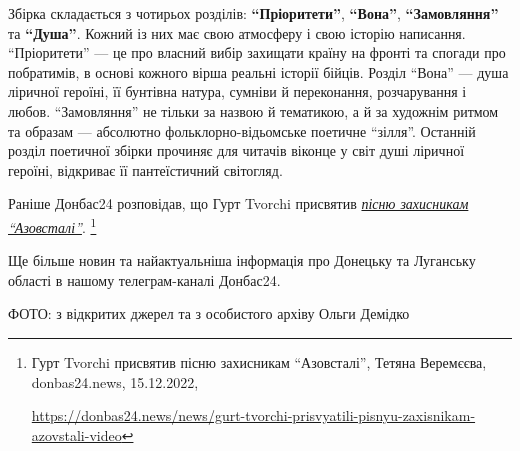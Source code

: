Збірка складається з чотирьох розділів: \textbf{\enquote{Пріоритети}},
\textbf{\enquote{Вона}}, \textbf{\enquote{Замовляння}} та
\textbf{\enquote{Душа}}. Кожний із них має свою атмосферу і свою історію
написання. \enquote{Пріоритети} — це про власний вибір захищати країну на
фронті та спогади про побратимів, в основі кожного вірша реальні історії
бійців. Розділ \enquote{Вона} — душа ліричної героїні, її бунтівна натура,
сумніви й переконання, розчарування і любов.  \enquote{Замовляння} не тільки за
назвою й тематикою, а й за художнім ритмом та образам — абсолютно
фольклорно-відьомське поетичне \enquote{зілля}. Останній розділ поетичної
збірки прочиняє для читачів віконце у світ душі ліричної героїні, відкриває її
пантеїстичний світогляд.


Раніше Донбас24 розповідав, що Гурт Tvorchi присвятив \href{https://donbas24.news/news/gurt-tvorchi-prisvyatili-pisnyu-zaxisnikam-azovstali-video}{\emph{пісню захисникам \enquote{Азовсталі}}}.%
\footnote{Гурт Tvorchi присвятив пісню захисникам \enquote{Азовсталі}, Тетяна Веремєєва, donbas24.news, 15.12.2022, \par\url{https://donbas24.news/news/gurt-tvorchi-prisvyatili-pisnyu-zaxisnikam-azovstali-video}}

Ще більше новин та найактуальніша інформація про Донецьку та Луганську області
в нашому телеграм-каналі Донбас24.

ФОТО: з відкритих джерел та з особистого архіву Ольги Демідко


